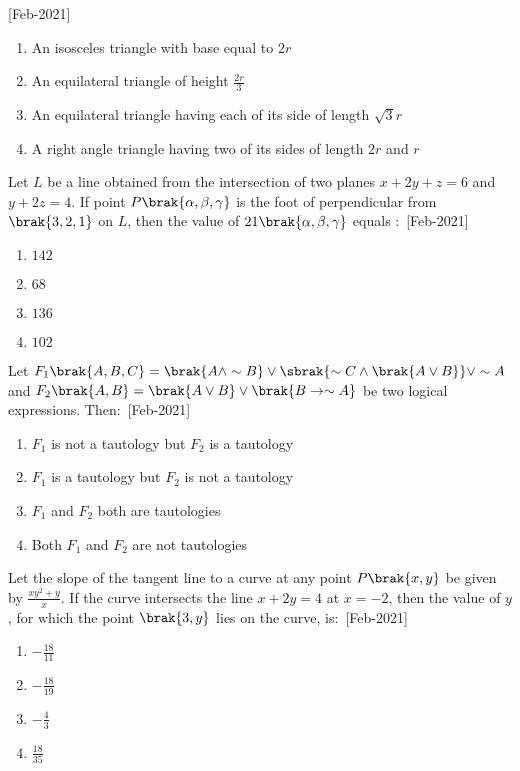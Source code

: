     \hfill{[Feb-2021]}
        \begin{enumerate}
            \item An isosceles triangle with base equal to $2r$
            \item An equilateral triangle of height $\frac{2r}{3}$
            \item An equilateral triangle having each of its side of length $\sqrt{3}r$
            \item A right angle triangle having two of its sides of length $2r$ and $r$
        \end{enumerate}
    \item Let $L$ be a line obtained from the intersection of two planes $x+2y+z=6$ and $y+2z=4$. If point $P\brak{\alpha,\beta,\gamma}$ is the foot of perpendicular from $\brak{3,2,1}$ on $L$, then the value of $21\brak{\alpha,\beta,\gamma}$ equals $\colon$
    \hfill{[Feb-2021]}
        \begin{enumerate}
            \item $142$
            \item $68$
            \item $136$
            \item $102$
        \end{enumerate}
    \item Let $F_1\brak{A,B,C}=\brak{A\wedge \sim B}\vee \sbrak{\sim C\wedge\brak{A\vee B}}\vee \sim A$ and $F_2\brak{A,B}=\brak{A\vee B}\vee \brak{B\rightarrow \sim A}$ be two logical expressions. Then$\colon$
    \hfill{[Feb-2021]}
        \begin{enumerate}
            \item $F_1$ is not a tautology but $F_2$ is a tautology
            \item $F_1$ is a tautology but $F_2$ is not a tautology
            \item $F_1$ and $F_2$ both are tautologies
            \item Both $F_1$ and $F_2$ are not tautologies
        \end{enumerate}
    \item Let the slope of the tangent line to a curve at any point $P\brak{x,y}$ be given by $\frac{xy^2+y}{x}$. If the curve intersects the line $x+2y=4$ at $x=-2$, then the value of $y$, for which the point $\brak{3,y}$ lies on the curve, is$\colon$
    \hfill{[Feb-2021]}
        \begin{enumerate}
            \item $-\frac{18}{11}$
            \item $-\frac{18}{19}$
            \item $-\frac{4}{3}$
            \item $\frac{18}{35}$
        \end{enumerate}
